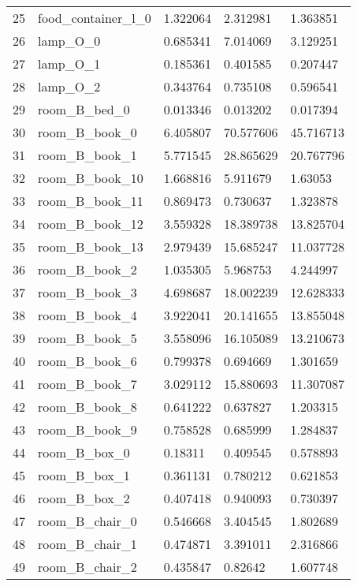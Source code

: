 \begin{longtable}{ @{\zz\extracolsep{\fill}} l|llll}
25 & food\_container\_l\_0    & 1.322064 & 2.312981  & 1.363851  \\
26 & lamp\_O\_0               & 0.685341 & 7.014069  & 3.129251  \\
27 & lamp\_O\_1               & 0.185361 & 0.401585  & 0.207447  \\
28 & lamp\_O\_2               & 0.343764 & 0.735108  & 0.596541  \\
29 & room\_B\_bed\_0          & 0.013346 & 0.013202  & 0.017394  \\
30 & room\_B\_book\_0         & 6.405807 & 70.577606 & 45.716713 \\
31 & room\_B\_book\_1         & 5.771545 & 28.865629 & 20.767796 \\
32 & room\_B\_book\_10        & 1.668816 & 5.911679  & 1.63053   \\
33 & room\_B\_book\_11        & 0.869473 & 0.730637  & 1.323878  \\
34 & room\_B\_book\_12        & 3.559328 & 18.389738 & 13.825704 \\
35 & room\_B\_book\_13        & 2.979439 & 15.685247 & 11.037728 \\
36 & room\_B\_book\_2         & 1.035305 & 5.968753  & 4.244997  \\
37 & room\_B\_book\_3         & 4.698687 & 18.002239 & 12.628333 \\
38 & room\_B\_book\_4         & 3.922041 & 20.141655 & 13.855048 \\
39 & room\_B\_book\_5         & 3.558096 & 16.105089 & 13.210673 \\
40 & room\_B\_book\_6         & 0.799378 & 0.694669  & 1.301659  \\
41 & room\_B\_book\_7         & 3.029112 & 15.880693 & 11.307087 \\
42 & room\_B\_book\_8         & 0.641222 & 0.637827  & 1.203315  \\
43 & room\_B\_book\_9         & 0.758528 & 0.685999  & 1.284837  \\
44 & room\_B\_box\_0          & 0.18311  & 0.409545  & 0.578893  \\
45 & room\_B\_box\_1          & 0.361131 & 0.780212  & 0.621853  \\
46 & room\_B\_box\_2          & 0.407418 & 0.940093  & 0.730397  \\
47 & room\_B\_chair\_0        & 0.546668 & 3.404545  & 1.802689  \\
48 & room\_B\_chair\_1        & 0.474871 & 3.391011  & 2.316866  \\
49 & room\_B\_chair\_2        & 0.435847 & 0.82642   & 1.607748  \\

\end{longtable}
